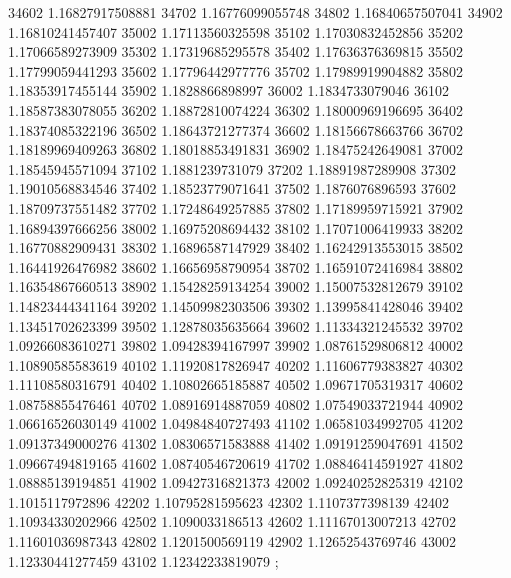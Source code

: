 {34602 1.16827917508881
34702 1.16776099055748
34802 1.16840657507041
34902 1.16810241457407
35002 1.17113560325598
35102 1.17030832452856
35202 1.17066589273909
35302 1.17319685295578
35402 1.17636376369815
35502 1.17799059441293
35602 1.17796442977776
35702 1.17989919904882
35802 1.18353917455144
35902 1.1828866898997
36002 1.1834733079046
36102 1.18587383078055
36202 1.18872810074224
36302 1.18000969196695
36402 1.18374085322196
36502 1.18643721277374
36602 1.18156678663766
36702 1.18189969409263
36802 1.18018853491831
36902 1.18475242649081
37002 1.18545945571094
37102 1.1881239731079
37202 1.18891987289908
37302 1.19010568834546
37402 1.18523779071641
37502 1.1876076896593
37602 1.18709737551482
37702 1.17248649257885
37802 1.17189959715921
37902 1.16894397666256
38002 1.16975208694432
38102 1.17071006419933
38202 1.16770882909431
38302 1.16896587147929
38402 1.16242913553015
38502 1.16441926476982
38602 1.16656958790954
38702 1.16591072416984
38802 1.16354867660513
38902 1.15428259134254
39002 1.15007532812679
39102 1.14823444341164
39202 1.14509982303506
39302 1.13995841428046
39402 1.13451702623399
39502 1.12878035635664
39602 1.11334321245532
39702 1.09266083610271
39802 1.09428394167997
39902 1.08761529806812
40002 1.10890585583619
40102 1.11920817826947
40202 1.11606779383827
40302 1.11108580316791
40402 1.10802665185887
40502 1.09671705319317
40602 1.08758855476461
40702 1.08916914887059
40802 1.07549033721944
40902 1.06616526030149
41002 1.04984840727493
41102 1.06581034992705
41202 1.09137349000276
41302 1.08306571583888
41402 1.09191259047691
41502 1.09667494819165
41602 1.08740546720619
41702 1.08846414591927
41802 1.08885139194851
41902 1.09427316821373
42002 1.09240252825319
42102 1.1015117972896
42202 1.10795281595623
42302 1.1107377398139
42402 1.10934330202966
42502 1.1090033186513
42602 1.11167013007213
42702 1.11601036987343
42802 1.1201500569119
42902 1.12652543769746
43002 1.12330441277459
43102 1.12342233819079
};

